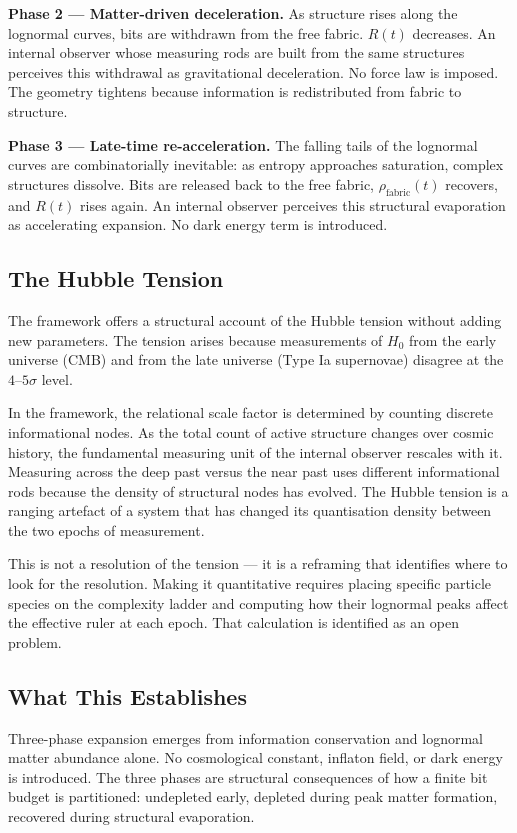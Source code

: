 \textbf{Phase 2 --- Matter-driven deceleration.} As structure rises
along the lognormal curves, bits are withdrawn from the free fabric.
$R(t)$ decreases. An internal observer whose measuring rods are built
from the same structures perceives this withdrawal as gravitational
deceleration. No force law is imposed. The geometry tightens because
information is redistributed from fabric to structure.

\textbf{Phase 3 --- Late-time re-acceleration.} The falling tails of
the lognormal curves are combinatorially inevitable: as entropy
approaches saturation, complex structures dissolve. Bits are released
back to the free fabric, $\rho_{\mathrm{fabric}}(t)$ recovers, and
$R(t)$ rises again. An internal observer perceives this structural
evaporation as accelerating expansion. No dark energy term is
introduced.

\subsection{The Hubble Tension}

The framework offers a structural account of the Hubble tension without
adding new parameters. The tension arises because measurements of $H_0$
from the early universe (CMB) and from the late universe (Type Ia
supernovae) disagree at the $4$--$5\sigma$ level.

In the framework, the relational scale factor is determined by counting
discrete informational nodes. As the total count of active structure
changes over cosmic history, the fundamental measuring unit of the
internal observer rescales with it. Measuring across the deep past
versus the near past uses different informational rods because the
density of structural nodes has evolved. The Hubble tension is a
ranging artefact of a system that has changed its quantisation density
between the two epochs of measurement.

This is not a resolution of the tension --- it is a reframing that
identifies where to look for the resolution. Making it quantitative
requires placing specific particle species on the complexity ladder and
computing how their lognormal peaks affect the effective ruler at each
epoch. That calculation is identified as an open problem.

\subsection{What This Establishes}

Three-phase expansion emerges from information conservation and
lognormal matter abundance alone. No cosmological constant, inflaton
field, or dark energy is introduced. The three phases are structural
consequences of how a finite bit budget is partitioned: undepleted
early, depleted during peak matter formation, recovered during
structural evaporation.

